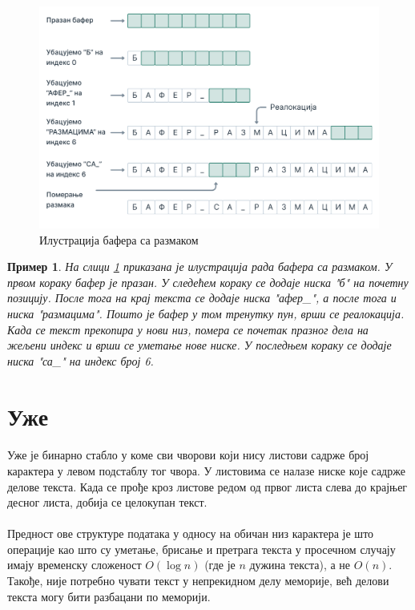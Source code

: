 \documentclass[12pt,oneside]{memoir}
\newtheorem{exmp}{Пример}
\begin{document}
\begin{figure}[!ht]
	\centering
	\includegraphics[width=1.1\textwidth]{images/Bafer_3.png}
	\caption{Илустрација бафера са размаком}
	\label{fig:gap_buffer}
\end{figure}

\begin{exmp}

На слици \ref{fig:gap_buffer} приказана је  илустрација рада бафера са размаком.
У првом кораку бафер је празан. У следећем кораку се додаје ниска \textit{"б"} на почетну позицију. После тога на крај текста се додаје ниска \textit{"афер\_"}, а после тога и ниска
\textit{"размацима"}.  Пошто је бафер у том тренутку пун, врши се реалокација. Када се текст прекопира у нови низ, помера се почетак празног дела на жељени индекс и врши се
уметање нове ниске. У последњем кораку се додаје ниска \textit{"са\_"} на индекс број 6. 

\end{exmp}


\section{Уже}
\paragraph{}
Уже је бинарно стабло у коме сви чворови који нису листови садрже број карактера у 
левом подстаблу тог чвора. У листовима се налазе ниске које садрже делове текста. 
Када се прође кроз листове редом од првог листа слева до крајњег десног листа, 
добија се целокупан текст.

\paragraph{}
Предност ове структуре података у односу на обичан низ карактера је што операције као што су уметање, брисање и претрага текста у просечном случају имају временску сложеност \(O(\log{}n)\) (где је \(n\) дужина текста), а не \(O(n)\). Такође, није потребно чувати
текст у непрекидном делу меморије, већ делови текста могу бити разбацани по меморији.
\end{document}
